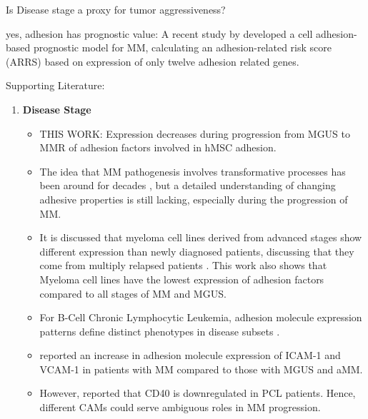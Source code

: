 Is Disease stage a proxy for tumor aggressiveness?


yes, adhesion has prognostic value: A recent study by
\citet{huDevelopmentCellAdhesionbased2024} developed a cell adhesion-based
prognostic model for MM, calculating an adhesion-related risk score (ARRS) based
on expression of only twelve adhesion related genes.


Supporting Literature:

\begin{enumerate}
      \item \textbf{Disease Stage}
            \begin{itemize}
                  \item THIS WORK: Expression decreases during progression from
                        \ac{MGUS} to \ac{MMR} of adhesion factors involved in hMSC
                        adhesion.
                  \item The idea that MM pathogenesis involves transformative
                        processes has been around for decades
                        \cite{hallekMultipleMyelomaIncreasing1998}, but a
                        detailed understanding of changing adhesive properties
                        is still lacking, especially during the progression of
                        MM.
                  \item It is discussed that myeloma cell lines derived from
                        advanced stages show different expression than newly
                        diagnosed patients, discussing that they come from
                        multiply relapsed patients
                        \cite{sarinEvaluatingEfficacyMultiple2020}. This work
                        also shows that Myeloma cell lines have the lowest
                        expression of adhesion factors compared to all stages of
                        \ac{MM} and \ac{MGUS}.
                  \item For B-Cell Chronic Lymphocytic Leukemia, adhesion
                        molecule expression patterns define distinct phenotypes in
                        disease subsets \cite{derossiAdhesionMoleculeExpression1993}.
                  \item \citet{terposIncreasedCirculatingVCAM12016} reported an
                        increase in adhesion molecule expression of ICAM-1 and
                        VCAM-1 in patients with \ac{MM} compared to those with
                        \ac{MGUS} and \ac{aMM}.
                  \item However, \citet{perez-andresClonalPlasmaCells2005}
                        reported that CD40 is downregulated in \ac{PCL}
                        patients. Hence, different \acp{CAM} could serve
                        ambiguous roles in \ac{MM} progression.
            \end{itemize}

\end{enumerate}




